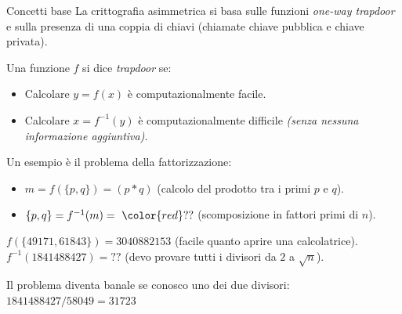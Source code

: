 \documentclass[handout, xcolor=dvipsnames,aspectratio=169]{beamer}
\begin{document}
\begin{frame}{Concetti base}
  La crittografia asimmetrica si basa sulle funzioni \textit{one-way trapdoor} e sulla presenza di una coppia di chiavi (chiamate chiave pubblica e chiave privata).
  
  \pause
  
  \medskip
  
  Una funzione $f$ si dice \textit{trapdoor} se: 
  \begin{itemize}
    \item Calcolare $y = f(x)$ è computazionalmente facile.
    \item Calcolare $x = f^{-1}(y)$ è computazionalmente difficile \textit{(senza nessuna informazione aggiuntiva)}.
  \end{itemize}

  \pause
  
  \smallskip
  
  Un esempio è il problema della fattorizzazione:
  \begin{itemize}
    \item $m = f(\{p, q\}) = (p * q)$ (calcolo del prodotto tra i primi $p$ e $q$).
    \item $\{p, q\} = f^{-1}(m) =\ {\color{red}??} $ (scomposizione in fattori primi di $n$).
  \end{itemize}
    
  \smallskip
  
  \pause
  
  $f(\{49171, 61843\}) = 3040882153$ (facile quanto aprire una calcolatrice).
  $f^{-1}(1841488427) = ??$ (devo provare tutti i divisori da $2$ a $\sqrt{n}$).
  
  \pause
  
  Il problema diventa banale se conosco uno dei due divisori:
  $1841488427 / 58049 = 31723$

\end{frame}
\end{document}
